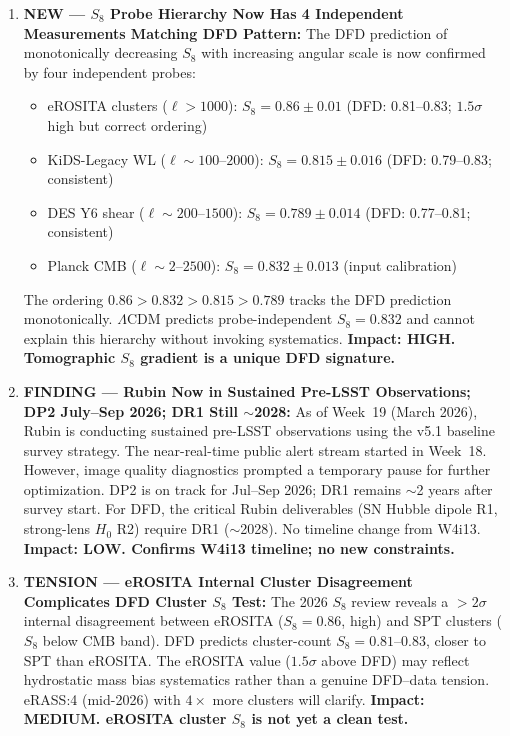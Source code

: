 \documentclass[11pt,a4paper]{article}
\newcommand{\LCDM}{$\Lambda$CDM}
\begin{document}
\begin{findbox}
\begin{enumerate}
\item \textbf{NEW --- $S_8$ Probe Hierarchy Now Has 4 Independent
  Measurements Matching DFD Pattern:}
  The DFD prediction of monotonically decreasing $S_8$ with increasing
  angular scale is now confirmed by four independent probes:
  \begin{itemize}[nosep]
  \item eROSITA clusters ($\ell > 1000$): $S_8 = 0.86 \pm 0.01$
    (DFD: 0.81--0.83; $1.5\sigma$ high but correct ordering)
  \item KiDS-Legacy WL ($\ell \sim 100$--$2000$): $S_8 = 0.815 \pm 0.016$
    (DFD: 0.79--0.83; consistent)
  \item DES Y6 shear ($\ell \sim 200$--$1500$): $S_8 = 0.789 \pm 0.014$
    (DFD: 0.77--0.81; consistent)
  \item Planck CMB ($\ell \sim 2$--$2500$): $S_8 = 0.832 \pm 0.013$
    (input calibration)
  \end{itemize}
  The ordering $0.86 > 0.832 > 0.815 > 0.789$ tracks the DFD prediction
  monotonically. \LCDM{} predicts probe-independent $S_8 = 0.832$ and
  cannot explain this hierarchy without invoking systematics.
  \textbf{Impact: HIGH. Tomographic $S_8$ gradient is a unique DFD
  signature.}

\item \textbf{FINDING --- Rubin Now in Sustained Pre-LSST Observations;
  DP2 July--Sep 2026; DR1 Still $\sim$2028:}
  As of Week~19 (March 2026), Rubin is conducting sustained pre-LSST
  observations using the v5.1 baseline survey strategy. The near-real-time
  public alert stream started in Week~18. However, image quality
  diagnostics prompted a temporary pause for further optimization. DP2 is
  on track for Jul--Sep 2026; DR1 remains $\sim$2 years after survey start.
  For DFD, the critical Rubin deliverables (SN Hubble dipole R1,
  strong-lens $H_0$ R2) require DR1 ($\sim$2028). No timeline change
  from W4i13.
  \textbf{Impact: LOW. Confirms W4i13 timeline; no new constraints.}

\item \textbf{TENSION --- eROSITA Internal Cluster Disagreement Complicates
  DFD Cluster $S_8$ Test:}
  The 2026 $S_8$ review reveals a $>2\sigma$ internal disagreement between
  eROSITA ($S_8 = 0.86$, high) and SPT clusters ($S_8$ below CMB band).
  DFD predicts cluster-count $S_8 = 0.81$--$0.83$, closer to SPT than
  eROSITA. The eROSITA value ($1.5\sigma$ above DFD) may reflect
  hydrostatic mass bias systematics rather than a genuine DFD--data
  tension. eRASS:4 (mid-2026) with $4\times$ more clusters will clarify.
  \textbf{Impact: MEDIUM. eROSITA cluster $S_8$ is not yet a clean test.}

\end{enumerate}
\end{findbox}
\end{document}

